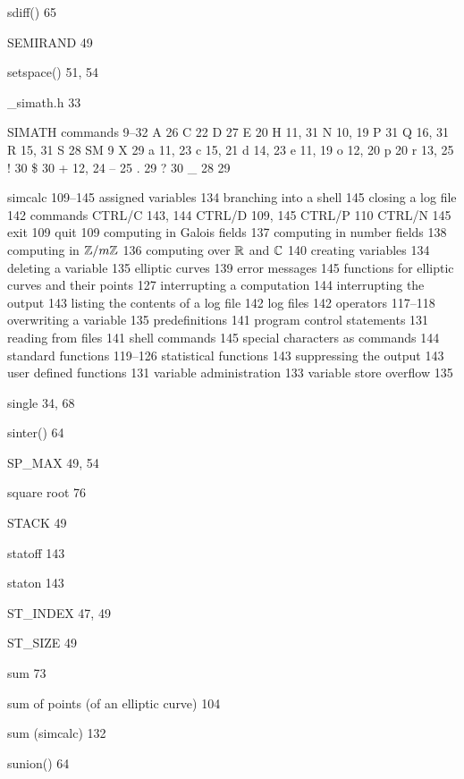 \begin{theindex}
\item sdiff() 65
\item SEMIRAND 49
\item setspace() 51, 54
\item \_simath.h 33
\item SIMATH commands 9--32
  \subitem A 26
  \subitem C 22
  \subitem D 27
  \subitem E 20
  \subitem H 11, 31
  \subitem N 10, 19
  \subitem P 31
  \subitem Q 16, 31
  \subitem R 15, 31
  \subitem S 28
  \subitem SM 9
  \subitem X 29     
  \subitem a 11, 23
  \subitem c 15, 21
  \subitem d 14, 23
  \subitem e 11, 19
  \subitem o 12, 20
  \subitem p 20
  \subitem r 13, 25    
  \subitem ! 30
  \subitem \$ 30
  \subitem + 12, 24
  \subitem -- 25
  \subitem . 29
  \subitem ? 30
  \subitem \_ 28
  \subitem {} 29   %
\item simcalc 109--145
  \subitem assigned variables 134
  \subitem branching into a shell 145
  \subitem closing a log file 142
  \subitem commands
    \subsubitem CTRL/C 143, 144
    \subsubitem CTRL/D 109, 145
    \subsubitem CTRL/P 110
    \subsubitem CTRL/N 145
    \subsubitem exit 109
    \subsubitem quit 109
  \subitem computing in Galois fields 137
  \subitem computing in number fields 138 
  \subitem computing in $\mbox{$\mathbb Z$}/m\mbox{$\mathbb Z$}$ 136
  \subitem computing over $\mbox{$\mathbb R$}$ and $\mbox{$\mathbb C$}$ 140
  \subitem creating variables 134
  \subitem deleting a variable 135
  \subitem elliptic curves 139
  \subitem error messages 145
  \subitem functions for elliptic curves and their points 127
  \subitem interrupting a computation 144
  \subitem interrupting the output 143
  \subitem listing the contents of a log file 142
  \subitem log files 142
  \subitem operators 117--118
  \subitem overwriting a variable 135
  \subitem predefinitions 141
  \subitem program control statements 131
  \subitem reading from files 141
  \subitem shell commands 145
  \subitem special characters as commands 144
  \subitem standard functions 119--126
  \subitem statistical functions 143
  \subitem suppressing the output 143
  \subitem user defined functions 131
  \subitem variable administration 133
  \subitem variable store overflow 135
\item single 34, 68
\item sinter() 64
\item SP\_MAX 49, 54
\item square root 76
\item STACK 49
\item statoff 143
\item staton 143
\item ST\_INDEX 47, 49
\item ST\_SIZE 49
\item sum 73
\item sum of points (of an elliptic curve) 104
\item sum (simcalc) 132
\item sunion() 64


\end{theindex}
